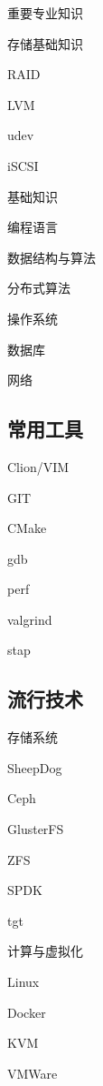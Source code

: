 重要专业知识
\begin{enumbox}
\item 存储基础知识
\item RAID
\item LVM
\item udev
\item iSCSI
\end{enumbox}

基础知识
\begin{enumbox}
\item 编程语言
\item 数据结构与算法
\item 分布式算法
\item 操作系统
\item 数据库
\item 网络
\end{enumbox}

\subsection{常用工具}

\begin{enumbox}
\item Clion/VIM
\item GIT
\item CMake
\item gdb
\item perf
\item valgrind
\item stap
\end{enumbox}

\subsection{流行技术}

存储系统
\begin{enumbox}
\item SheepDog
\item Ceph
\item GlusterFS
\item ZFS
\item SPDK
\item tgt
\end{enumbox}

计算与虚拟化
\begin{enumbox}
\item Linux
\item Docker
\item KVM
\item VMWare
\end{enumbox}

